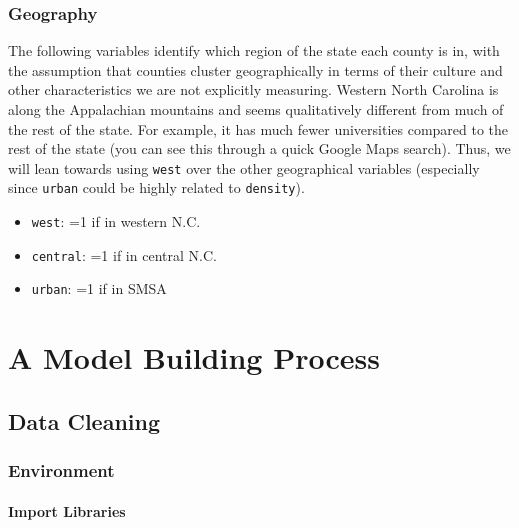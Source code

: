 \documentclass[]{article}
\providecommand{\tightlist}{%
  \setlength{\itemsep}{0pt}\setlength{\parskip}{0pt}}
\let\oldparagraph\paragraph
\renewcommand{\paragraph}[1]{\oldparagraph{#1}\mbox{}}
\begin{document}
\hypertarget{geography}{%
\subsubsection{Geography}\label{geography}}

The following variables identify which region of the state each county
is in, with the assumption that counties cluster geographically in terms
of their culture and other characteristics we are not explicitly
measuring. Western North Carolina is along the Appalachian mountains and
seems qualitatively different from much of the rest of the state. For
example, it has much fewer universities compared to the rest of the
state (you can see this through a quick Google Maps search). Thus, we
will lean towards using \texttt{west} over the other geographical
variables (especially since \texttt{urban} could be highly related to
\texttt{density}).

\begin{itemize}
\tightlist
\item
  \texttt{west}: =1 if in western N.C.
\item
  \texttt{central}: =1 if in central N.C.
\item
  \texttt{urban}: =1 if in SMSA
\end{itemize}

\hypertarget{a-model-building-process}{%
\section{A Model Building Process}\label{a-model-building-process}}

\hypertarget{data-cleaning}{%
\subsection{Data Cleaning}\label{data-cleaning}}

\hypertarget{environment}{%
\subsubsection{Environment}\label{environment}}

\hypertarget{import-libraries}{%
\paragraph{Import Libraries}\label{import-libraries}}
\end{document}

